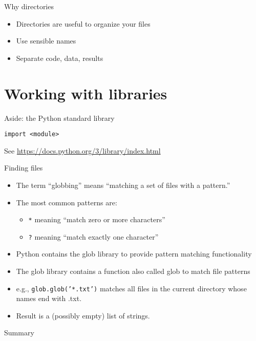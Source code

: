 \documentclass[aspectratio=169,usenames,dvipsnames]{beamer}
\begin{document}
\begin{frame}{Why directories}
    \begin{itemize}
        \item Directories are useful to organize your files
        \item Use sensible names
        \item Separate code, data, results
    \end{itemize}
\end{frame}

\section{Working with libraries}
\frame{\tableofcontents[currentsection]}

\begin{frame}[fragile]{Aside: the Python standard library}
\begin{lstlisting}
import <module>
\end{lstlisting}

    See \url{https://docs.python.org/3/library/index.html}
\end{frame}



\begin{frame}[fragile]{Finding files}
    \begin{itemize}
        \item The term ``globbing'' means ``matching a set of files with a pattern.''
        \item The most common patterns are:
            \begin{itemize}
                \item \texttt{*} meaning ``match zero or more characters''
                \item \texttt{?} meaning ``match exactly one character''
            \end{itemize}
        \item Python contains the glob library to provide pattern matching functionality
        \item The glob library contains a function also called glob to match
            file patterns
        \item e.g., \texttt{glob.glob('*.txt')} matches all files in the
            current directory whose names end with .txt.
        \item Result is a (possibly empty) list of strings.
    \end{itemize}
\end{frame}

\begin{frame}{Summary}
\end{frame}
\end{document}
